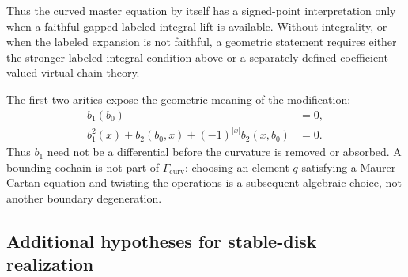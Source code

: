 \documentclass[11pt,letterpaper,twoside]{article}
\theoremstyle{plain}
\theoremstyle{definition}
\theoremstyle{remark}
\begin{document}
Thus the curved master equation by itself has a signed-point interpretation only when a faithful gapped labeled integral lift is available.  Without integrality, or when the labeled expansion is not faithful, a geometric statement requires either the stronger labeled integral condition above or a separately defined coefficient-valued virtual-chain theory.

The first two arities expose the geometric meaning of the modification:
\begin{align}
 b_1(b_0)&=0,\label{eq:curved-arity-zero}\\
 b_1^2(x)+b_2(b_0,x)+(-1)^{|x|}b_2(x,b_0)&=0.\label{eq:curved-arity-one}
\end{align}
Thus \(b_1\) need not be a differential before the curvature is removed or absorbed.  A bounding cochain is not part of \(\Gamma_{\mathrm{curv}}\): choosing an element \(q\) satisfying a Maurer--Cartan equation and twisting the operations is a subsequent algebraic choice, not another boundary degeneration.

\subsection{Additional hypotheses for stable-disk realization}
\end{document}
